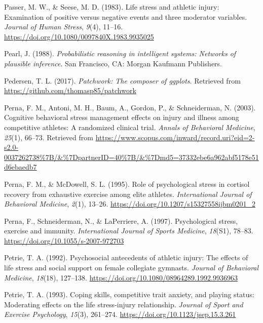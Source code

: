 \documentclass[
  english,
  man,floatsintext]{apa6}
\begin{document}
\leavevmode\hypertarget{ref-Passer1983a}{}%
Passer, M. W., \& Seese, M. D. (1983). Life stress and athletic injury: Examination of positive versus negative events and three moderator variables. \emph{Journal of Human Stress}, \emph{9}(4), 11--16. \url{https://doi.org/10.1080/0097840X.1983.9935025}

\leavevmode\hypertarget{ref-Pearl1988}{}%
Pearl, J. (1988). \emph{Probabilistic reasoning in intelligent systems: Networks of plausible inference}. San Francisco, CA: Morgan Kaufmann Publishers.

\leavevmode\hypertarget{ref-R-patchwork}{}%
Pedersen, T. L. (2017). \emph{Patchwork: The composer of ggplots}. Retrieved from \url{https://github.com/thomasp85/patchwork}

\leavevmode\hypertarget{ref-Perna2003}{}%
Perna, F. M., Antoni, M. H., Baum, A., Gordon, P., \& Schneiderman, N. (2003). Cognitive behavioral stress management effects on injury and illness among competitive athletes: A randomized clinical trial. \emph{Annals of Behavioral Medicine}, \emph{25}(1), 66--73. Retrieved from \url{https://www.scopus.com/inward/record.uri?eid=2-s2.0-0037262738\%7B/\&\%7DpartnerID=40\%7B/\&\%7Dmd5=37332ebe6a962abf5178e51d6ebaedb7}

\leavevmode\hypertarget{ref-Perna1995}{}%
Perna, F. M., \& McDowell, S. L. (1995). Role of psychological stress in cortisol recovery from exhaustive exercise among elite athletes. \emph{International Journal of Behavioral Medicine}, \emph{2}(1), 13--26. \url{https://doi.org/10.1207/s15327558ijbm0201_2}

\leavevmode\hypertarget{ref-Perna1997}{}%
Perna, F., Schneiderman, N., \& LaPerriere, A. (1997). Psychological stress, exercise and immunity. \emph{International Journal of Sports Medicine}, \emph{18}(S1), 78--83. \url{https://doi.org/10.1055/s-2007-972703}

\leavevmode\hypertarget{ref-Petrie1992}{}%
Petrie, T. A. (1992). Psychosocial antecedents of athletic injury: The effects of life stress and social support on female collegiate gymnasts. \emph{Journal of Behavioral Medicine}, \emph{18}(18), 127--138. \url{https://doi.org/10.1080/08964289.1992.9936963}

\leavevmode\hypertarget{ref-Petrie1993}{}%
Petrie, T. A. (1993). Coping skills, competitive trait anxiety, and playing status: Moderating effects on the life stress-injury relationship. \emph{Journal of Sport and Exercise Psychology}, \emph{15}(3), 261--274. \url{https://doi.org/10.1123/jsep.15.3.261}
\end{document}
